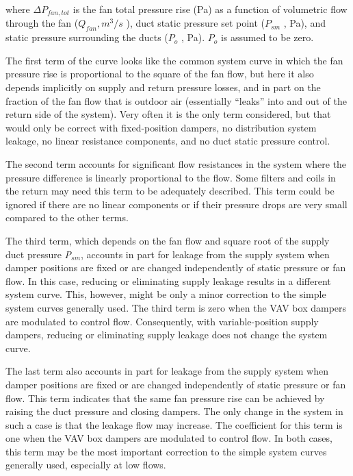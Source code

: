 where \(\Delta P_{fan,tot}\) is the fan total pressure rise (Pa) as a function of volumetric flow through the fan (\(Q_{fan}, m^3/s\) ), duct static pressure set point (\(P_{sm}\) , Pa), and static pressure surrounding the ducts (\(P_o\) , Pa). \(P_o\) is assumed to be zero.

The first term of the curve looks like the common system curve in which the fan pressure rise is proportional to the square of the fan flow, but here it also depends implicitly on supply and return pressure losses, and in part on the fraction of the fan flow that is outdoor air (essentially ``leaks'' into and out of the return side of the system). Very often it is the only term considered, but that would only be correct with fixed-position dampers, no distribution system leakage, no linear resistance components, and no duct static pressure control.

The second term accounts for significant flow resistances in the system where the pressure difference is linearly proportional to the flow. Some filters and coils in the return may need this term to be adequately described. This term could be ignored if there are no linear components or if their pressure drops are very small compared to the other terms.

The third term, which depends on the fan flow and square root of the supply duct pressure \emph{P\(_{sm}\)}, accounts in part for leakage from the supply system when damper positions are fixed or are changed independently of static pressure or fan flow. In this case, reducing or eliminating supply leakage results in a different system curve. This, however, might be only a minor correction to the simple system curves generally used. The third term is zero when the VAV box dampers are modulated to control flow. Consequently, with variable-position supply dampers, reducing or eliminating supply leakage does not change the system curve.

The last term also accounts in part for leakage from the supply system when damper positions are fixed or are changed independently of static pressure or fan flow. This term indicates that the same fan pressure rise can be achieved by raising the duct pressure and closing dampers. The only change in the system in such a case is that the leakage flow may increase. The coefficient for this term is one when the VAV box dampers are modulated to control flow. In both cases, this term may be the most important correction to the simple system curves generally used, especially at low flows.

